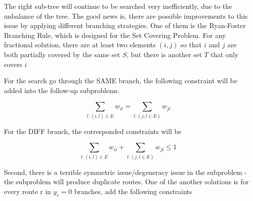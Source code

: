             The right sub-tree will continue to be searched very inefficiently, due to the unbalance of the tree. The good news is, there are possible improvements to this issue by applying different branching strategies. One of them is the Ryan-Foster Branching Rule, which is designed for the Set Covering Problem. For any fractional solution, there are at least two elements $(i,j)$ so that $i$ and $j$ are both partially covered by the same set $S$, but there is another set $T$ that only covers $i$
            \begin{figure}[h!]
                \centering
            \end{figure}

            For the search go through the SAME branch, the following constraint will be added into the follow-up subproblems.

            \begin{equation*}
                \sum_{l: (i, l) \in E} w_{il} = \sum_{l: (j, l \in E)} w_{jl}
            \end{equation*}

            For the DIFF branch, the corresponded constraints will be

            \begin{equation*}
                \sum_{l: (i, l) \in E} w_{il} + \sum_{l: (j, l \in E)} w_{jl} \le 1
            \end{equation*}

            Second, there is a terrible symmetric issue/degeneracy issue in the subproblem - the subproblem will produce duplicate routes. One of the another solutions is for every route r in $y_r = 0$ branches, add the following constraints

